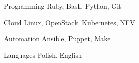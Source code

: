 

\begin{cvskills}

  \cvskill
    {Programming} %
    {Ruby, Bash, Python, Git} %

  \cvskill
    {Cloud} %
    {Linux, OpenStack, Kubernetes, NFV} %

  \cvskill
    {Automation} %
    {Ansible, Puppet, Make} %

  \cvskill
    {Languages} %
    {Polish, English} %

\end{cvskills}
